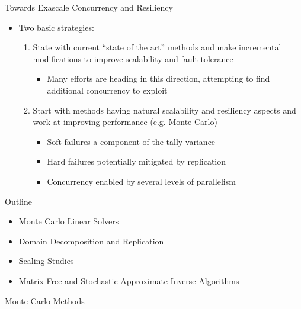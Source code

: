 \documentclass{beamer}
\begin{document}
\begin{frame}{Towards Exascale Concurrency and Resiliency}
  \begin{itemize}
    \item Two basic strategies:
      \vfill
      \begin{enumerate}
        \item State with current ``state of the art'' methods and make
          incremental modifications to improve scalability and fault
          tolerance
          \begin{itemize}
            \item Many efforts are heading in this direction, attempting
              to find additional concurrency to exploit
          \end{itemize}
        \vfill
        \item Start with methods having natural scalability and resiliency
          aspects and work at improving performance (e.g. Monte Carlo)
          \begin{itemize}
            \item Soft failures a component of the tally variance
            \item Hard failures potentially mitigated by replication
            \item Concurrency enabled by several levels of parallelism
          \end{itemize}
      \end{enumerate}
  \end{itemize}
  \vfill
\end{frame}

\begin{frame}{Outline}

  \begin{itemize}
  \item Monte Carlo Linear Solvers
    \vfill
  \item Domain Decomposition and Replication
    \vfill
  \item Scaling Studies
    \vfill
  \item Matrix-Free and Stochastic Approximate Inverse Algorithms
  \end{itemize}
  
\end{frame}

\begin{frame}

  \center Monte Carlo Methods
  
\end{frame}
\end{document}
